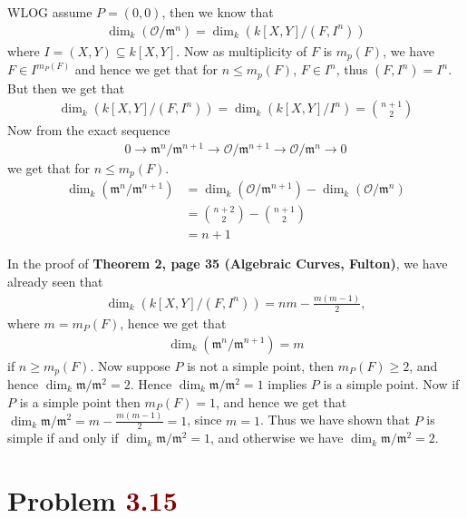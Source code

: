 \documentclass[12pt]{article}
\begin{document}
WLOG assume $P = (0,0)$, then we know that
\begin{align*}
    \dim_k \left( \mathscr{O}/\mathfrak{m}^n \right) = \dim_k \left( k[X,Y]/(F,I^n)\right)
\end{align*}
where $I = (X,Y) \subseteq k[X,Y]$. Now as multiplicity of $F$ is $m_p(F)$, we have $F \in I^{m_P(F)}$ and hence we get that for $n \leq m_p(F)$, $F \in I^n$, thus $(F,I^n) = I^n$. But then we get that
\begin{align*}
    \dim_k \left( k[X,Y]/(F,I^n)\right) = \dim_k\left(k[X,Y]/I^n\right) = \binom{n+1}{2}
\end{align*}
Now from the exact sequence
\begin{align*}
    0 \to \mathfrak{m}^n/\mathfrak{m}^{n+1} \to \mathscr{O}/\mathfrak{m}^{n+1} \to \mathscr{O}/\mathfrak{m}^n \to 0
\end{align*}
we get that for $n \leq m_p(F)$.
\begin{align*}
    \dim_k \left( \mathfrak{m}^n/\mathfrak{m}^{n+1} \right) & = \dim_k \left( \mathscr{O}/\mathfrak{m}^{n+1}\right) - \dim_k(\mathscr{O}/\mathfrak{m}^n) \\ &= \binom{n+2}{2} - \binom{n+1}{2} \\ &= n+1
\end{align*}

In the proof of \textbf{Theorem 2, page 35 (Algebraic Curves, Fulton)}, we have already seen that
\begin{align*}
    \dim_k \left(k[X,Y]/(F,I^n)\right) = n m - \frac{m(m-1)}{2},
\end{align*}
where $m = m_P(F)$, hence we get that
\begin{align*}
    \dim_k \left( \mathfrak{m}^n/\mathfrak{m}^{n+1} \right) = m
\end{align*}
if $n \geq m_p(F)$. Now suppose $P$ is not a simple point, then $m_P(F) \geq 2$, and hence $\dim_k \mathfrak{m}/\mathfrak{m}^2 = 2$. Hence $\dim_k \mathfrak{m}/\mathfrak{m}^2 = 1$ implies $P$ is a simple point. Now if $P$ is a simple point then $m_P(F) = 1$, and hence we get that $\dim_k \mathfrak{m}/\mathfrak{m}^2 = m - \frac{m(m-1)}{2} = 1$, since $m=1$. Thus we have shown that $P$ is simple if and only if $\dim_k \mathfrak{m}/\mathfrak{m}^2 = 1$, and otherwise we have $\dim_k \mathfrak{m}/\mathfrak{m}^2 = 2$.

\section{Problem \textcolor{maroon}{3.15}} %
\end{document}
